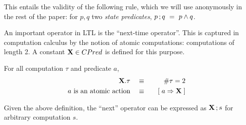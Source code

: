 This entails the validity of the following rule, which we will use
anonymously in the rest of the paper: for $p, q$ two \emph{state
  predicates}, $p \, ; q ~=~ p \land q$.


An important operator in LTL is the ``next-time operator''.   This is
captured in computation calculus by the notion of atomic computations:
computations of length 2.  A constant $\mathbf{X} \in CPred$ is defined for
this purpose.
\begin{Definition} For all computation $\tau$ and
  predicate $a$,
  \begin{eqnarray}
    \mathbf{X}.\tau  & ~~~\equiv~~~ & \# \tau = 2  \label{eq:comp-next} \\
    \textrm{$a$ is an atomic action} & ~~~\equiv~~~ & [\; a \Rightarrow \mathbf{X} \;] 
  \end{eqnarray}
\end{Definition}
Given the above definition, the ``next'' operator can be expressed
as $\mathbf{X}\,;s$ for arbitrary computation $s$.


